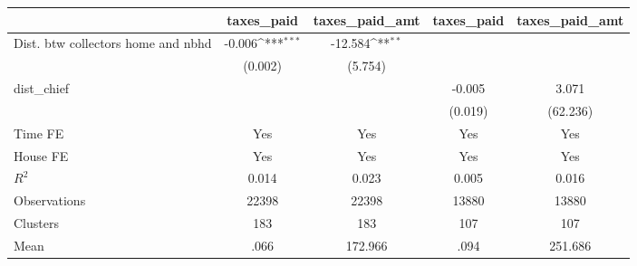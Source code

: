{
\def\sym#1{\ifmmode^{#1}\else\(^{#1}\)\fi}
\begin{tabular}{l*{4}{c}}
\hline\hline
                &\multicolumn{1}{c}{taxes\_paid}&\multicolumn{1}{c}{taxes\_paid\_amt}&\multicolumn{1}{c}{taxes\_paid}&\multicolumn{1}{c}{taxes\_paid\_amt}\\
\hline
Dist. btw collectors home and nbhd&   -0.006\sym{***}&  -12.584\sym{**} &                  &                  \\
                &  (0.002)         &  (5.754)         &                  &                  \\
dist\_chief      &                  &                  &   -0.005         &    3.071         \\
                &                  &                  &  (0.019)         & (62.236)         \\
Time FE         &      Yes         &      Yes         &      Yes         &      Yes         \\
House FE        &      Yes         &      Yes         &      Yes         &      Yes         \\
\hline
\(R^{2}\)       &    0.014         &    0.023         &    0.005         &    0.016         \\
Observations    &    22398         &    22398         &    13880         &    13880         \\
Clusters        &      183         &      183         &      107         &      107         \\
Mean            &     .066         &  172.966         &     .094         &  251.686         \\
\hline\hline
\end{tabular}
}
